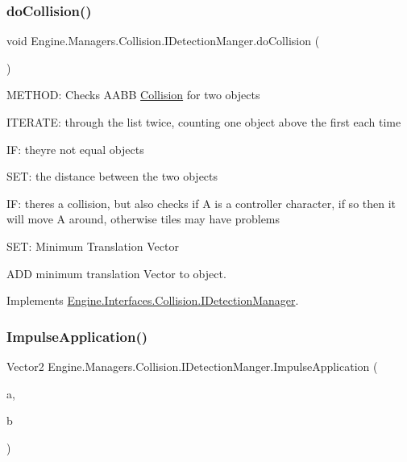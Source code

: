 \subsubsection{\texorpdfstring{do\+Collision()}{doCollision()}}
{\footnotesize\ttfamily void Engine.\+Managers.\+Collision.\+I\+Detection\+Manger.\+do\+Collision (\begin{DoxyParamCaption}{ }\end{DoxyParamCaption})\hspace{0.3cm}{\ttfamily [inline]}}



M\+E\+T\+H\+OD\+: Checks A\+A\+BB \hyperlink{a00268}{Collision} for two objects 

I\+T\+E\+R\+A\+TE\+: through the list twice, counting one object above the first each time

IF\+: they\textquotesingle{}re not equal objects

S\+ET\+: the distance between the two objects

IF\+: there\textquotesingle{}s a collision, but also checks if A is a controller character, if so then it will move A around, otherwise tiles may have problems

S\+ET\+: Minimum Translation Vector

A\+DD minimum translation Vector to object. 

Implements \hyperlink{a00430_a139cca7ebb8b37ceba1bb1439cde83bf}{Engine.\+Interfaces.\+Collision.\+I\+Detection\+Manager}.

\mbox{\label{a00502_a47c9b58bdaf1f773ea3932f8c574ae0b}} 
\subsubsection{\texorpdfstring{Impulse\+Application()}{ImpulseApplication()}}
{\footnotesize\ttfamily Vector2 Engine.\+Managers.\+Collision.\+I\+Detection\+Manger.\+Impulse\+Application (\begin{DoxyParamCaption}\item[{\hyperlink{a00434}{I\+Hitbox}}]{a,  }\item[{\hyperlink{a00434}{I\+Hitbox}}]{b }\end{DoxyParamCaption})\hspace{0.3cm}{\ttfamily [inline]}}



